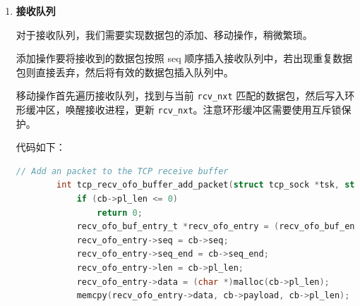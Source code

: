 \documentclass[UTF8]{report}
\newcommand{\tbf}[1]{\textbf{#1}}
\begin{document}
\begin{enumerate}
\begin{lstlisting}[language=C]
            // Retrieve the first send buffer entry
            send_buffer_entry_t *first_send_buffer_entry = list_entry(tsk->send_buf.next, send_buffer_entry_t, list);
        
            char *packet = (char *)malloc(first_send_buffer_entry->len);
        
            // Copy the packet data and update TCP sequence and acknowledgment numbers
            memcpy(packet, first_send_buffer_entry->packet, first_send_buffer_entry->len);
            struct iphdr *ip = packet_to_ip_hdr(packet);
            struct tcphdr *tcp = packet_to_tcp_hdr(packet);
            tcp->ack = htonl(tsk->rcv_nxt);
            tcp->checksum = tcp_checksum(ip, tcp);
            ip->checksum = ip_checksum(ip);
        
            // Calculate TCP data length and update TCP send window
            int tcp_data_len = ntohs(ip->tot_len) - IP_BASE_HDR_SIZE - TCP_BASE_HDR_SIZE;
            tsk->snd_wnd -= tcp_data_len;
        
            log(DEBUG, "retrans seq: %u\n", ntohl(tcp->seq));
        
            // Send the packet
            ip_send_packet(packet, first_send_buffer_entry->len);
            return 1;
        }
    \end{lstlisting}
    
    \item \tbf{接收队列}
    
    对于接收队列，我们需要实现数据包的添加、移动操作，稍微繁琐。

    添加操作要将接收到的数据包按照 seq 顺序插入接收队列中，若出现重复数据包则直接丢弃，然后将有效的数据包插入队列中。

    移动操作首先遍历接收队列，找到与当前 \texttt{rcv\_nxt} 匹配的数据包，然后写入环形缓冲区，唤醒接收进程，更新 \texttt{rcv\_nxt}。注意环形缓冲区需要使用互斥锁保护。

    代码如下：

    \begin{lstlisting}[language=C]
        // Add an packet to the TCP receive buffer
        int tcp_recv_ofo_buffer_add_packet(struct tcp_sock *tsk, struct tcp_cb *cb) {
            if (cb->pl_len <= 0)
                return 0;
            recv_ofo_buf_entry_t *recv_ofo_entry = (recv_ofo_buf_entry_t *)malloc(sizeof(recv_ofo_buf_entry_t));
            recv_ofo_entry->seq = cb->seq;
            recv_ofo_entry->seq_end = cb->seq_end;
            recv_ofo_entry->len = cb->pl_len;
            recv_ofo_entry->data = (char *)malloc(cb->pl_len);
            memcpy(recv_ofo_entry->data, cb->payload, cb->pl_len);
        

\end{lstlisting}
\end{enumerate}
\end{document}
